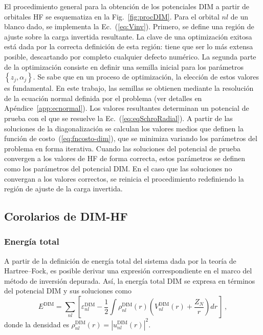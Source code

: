 El procedimiento general para la obtención de los potenciales DIM a 
partir de orbitales HF se esquematiza en la Fig.~\ref{fig:procDIM}. Para 
el orbital $nl$ de un blanco dado, se implementa la Ec.~(\ref{eq:Vinv}). 
Primero, se define una región de ajuste sobre la carga invertida 
resultante. La clave de una optimización exitosa está dada por la 
correcta definición de esta región: tiene que ser lo más extensa 
posible, descartando por completo cualquier defecto numérico. La segunda 
parte de la optimización consiste en definir una semilla inicial para 
los parámetros $\left\{z_j,\alpha_j\right\}$. Se sabe que en un proceso 
de optimización, la elección de estos valores es fundamental. En este 
trabajo, las semillas se obtienen mediante la resolución de la ecuación 
normal definida por el problema (ver detalles en 
Apéndice~\ref{app:ecnormal}). Los valores resultantes determinan un 
potencial de prueba con el que se resuelve la 
Ec.~(\ref{eq:eqSchroRadial}). A partir de las soluciones de la 
diagonalización se calculan los valores medios que definen la función de 
costo~(\ref{eq:fncosto-dim}), que se minimiza variando los parámetros 
del problema en forma iterativa. Cuando las soluciones del potencial de 
prueba convergen a los valores de HF de forma correcta, estos parámetros 
se definen como los parámetros del potencial DIM. En el caso que las 
soluciones no convergan a los valores correctos, se reinicia el 
procedimiento redefiniendo la región de ajuste de la carga invertida.

\subsection{Corolarios de DIM-HF}
\label{sec:corolarios}

\subsubsection*{Energía total}

A partir de la definición de energía total del sistema dada por la 
teoría de Hartree--Fock, es posible derivar una expresión 
correspondiente en el marco del método de inversión depurada. Así, la 
energía total DIM se expresa en términos del potencial DIM y sus 
soluciones como
\begin{equation}
E^{\mathrm{DIM}} = \sum\limits_{nl} 
\left[ 
\varepsilon_{nl}^{\mathrm{DIM}} - 
\frac{1}{2}\int  \rho_{nl}^{\mathrm{DIM}}(r)
\left( V_{nl}^{\mathrm{DIM}}(r) + \frac{Z_{N}}{r}\right) dr \,
\right] \, ,
\label{eq:Etotal}
\end{equation}
donde la densidad es 
$\rho_{nl}^{\mathrm{DIM}}(r)=|u_{nl}^{\mathrm{DIM}}(r)|^2$. 

